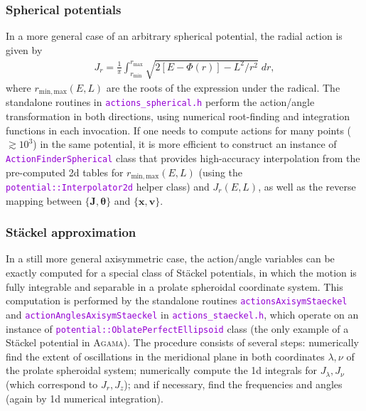 \documentclass[12pt]{article}
\newcommand{\Agama}{\textsc{Agama}\xspace}
\newcommand{\ttt}[1]{\textcolor{darkviolet}{\texttt{#1}}}
\newcommand{\bv}{\boldsymbol{v}}
\newcommand{\bx}{\boldsymbol{x}}
\newcommand{\bJ}{\boldsymbol{J}}
\newcommand{\bt}{\boldsymbol{\theta}}
\begin{document}
\subsubsection{Spherical potentials}  \label{sec:ActionsSpherical}

In a more general case of an arbitrary spherical potential, the radial action is given by 
\begin{align*}
J_r = \frac{1}{\pi} \int_{r_\mathrm{min}}^{r_\mathrm{max}} \sqrt{2[E-\Phi(r)] - L^2/r^2}\;dr,
\end{align*}
where $r_\mathrm{min,max}(E,L)$ are the roots of the expression under the radical.
The standalone routines in \ttt{actions_spherical.h} perform the action/angle transformation in both directions, using numerical root-finding and integration functions in each invocation. If one needs to compute actions for many points ($\gtrsim 10^3$) in the same potential, it is more efficient to construct an instance of \ttt{ActionFinderSpherical} class that provides high-accuracy interpolation from the pre-computed 2d tables for $r_\mathrm{min,max}(E,L)$ (using the \ttt{potential::Interpolator2d} helper class) and $J_r(E,L)$, as well as the reverse mapping between $\{\bJ,\bt\}$ and $\{\bx,\bv\}$.

\subsubsection{St\"ackel approximation}  \label{sec:ActionsStaeckel}

In a still more general axisymmetric case, the action/angle variables can be exactly computed for a special class of St\"ackel potentials, in which the motion is fully integrable and separable in a prolate spheroidal coordinate system. This computation is performed by the standalone routines \ttt{actionsAxisymStaeckel} and \ttt{actionAnglesAxisymStaeckel} in \ttt{actions_staeckel.h}, which operate on an instance of \ttt{potential::OblatePerfectEllipsoid} class (the only example of a St\"ackel potential in \Agama). The procedure consists of several steps: numerically find the extent of oscillations in the meridional plane in both coordinates $\lambda, \nu$ of the prolate spheroidal system; numerically compute the 1d integrals for $J_\lambda, J_\nu$ (which correspond to $J_r, J_z$); and if necessary, find the frequencies and angles (again by 1d numerical integration).
\end{document}
